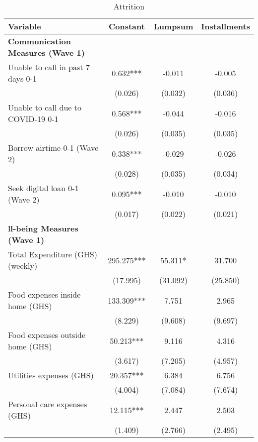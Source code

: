 \begin{ThreePartTable}
\begin{table}[tbp]\centering
\def\sym#1{\ifmmode^{#1}\else\(^{#1}\)\fi}
\caption{Attrition}
\begin{tabular}{lccc}
\hline
 Variable & Constant & Lumpsum & Installments \\ [0.1em] 
\hline\hline
\textbf{Communication Measures (Wave 1)} & & & \\ 
 Unable to call in past 7 days 0-1 & 0.632*** & -0.011 & -0.005 \\ [0.1em] 
                   &      (0.026)     &      (0.032)     &      (0.036)     \\ [0.1em] 
 Unable to call due to COVID-19 0-1 & 0.568*** & -0.044 & -0.016 \\ [0.1em] 
                   &      (0.026)     &      (0.035)     &      (0.035)     \\ [0.1em] 
 Borrow airtime 0-1 (Wave 2) & 0.338*** & -0.029 & -0.026 \\ [0.1em] 
                   &      (0.028)     &      (0.035)     &      (0.034)     \\ [0.1em] 
 Seek digital loan 0-1 (Wave 2) & 0.095*** & -0.010 & -0.010 \\ [0.1em] 
                   &      (0.017)     &      (0.022)     &      (0.021)     \\ [0.1em] 
\textbf{ll-being Measures (Wave 1)} & & & \\ 
 Total Expenditure (GHS) (weekly) & 295.275*** & 55.311* & 31.700 \\ [0.1em] 
                   &      (17.995)     &      (31.092)     &      (25.850)     \\ [0.1em] 
 Food expenses inside home (GHS) & 133.309*** & 7.751 & 2.965 \\ [0.1em] 
                   &      (8.229)     &      (9.608)     &      (9.697)     \\ [0.1em] 
 Food expenses outside home (GHS) & 50.213*** & 9.116 & 4.316 \\ [0.1em] 
                   &      (3.617)     &      (7.205)     &      (4.957)     \\ [0.1em] 
 Utilities expenses (GHS) & 20.357*** & 6.384 & 6.756 \\ [0.1em] 
                   &      (4.004)     &      (7.084)     &      (7.674)     \\ [0.1em] 
 Personal care expenses (GHS) & 12.115*** & 2.447 & 2.503 \\ [0.1em] 
                   &      (1.409)     &      (2.766)     &      (2.495)     \\ [0.1em] 

\end{tabular}
\end{table}
\end{ThreePartTable}
